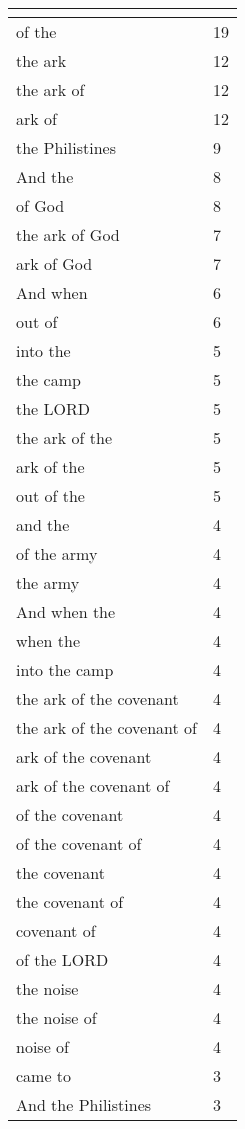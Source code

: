 \begin{center}
\begin{longtable}{|p{3.0in}|p{0.5in}|}
\hline \multicolumn{2}{c}{{ }} \\ \hline
\endfoot 
of the & 19\\ \hline 
the ark & 12\\ \hline 
the ark of & 12\\ \hline 
ark of & 12\\ \hline 
the Philistines & 9\\ \hline 
And the & 8\\ \hline 
of God & 8\\ \hline 
the ark of God & 7\\ \hline 
ark of God & 7\\ \hline 
And when & 6\\ \hline 
out of & 6\\ \hline 
into the & 5\\ \hline 
the camp & 5\\ \hline 
the LORD & 5\\ \hline 
the ark of the & 5\\ \hline 
ark of the & 5\\ \hline 
out of the & 5\\ \hline 
and the & 4\\ \hline 
of the army & 4\\ \hline 
the army & 4\\ \hline 
And when the & 4\\ \hline 
when the & 4\\ \hline 
into the camp & 4\\ \hline 
the ark of the covenant & 4\\ \hline 
the ark of the covenant of & 4\\ \hline 
ark of the covenant & 4\\ \hline 
ark of the covenant of & 4\\ \hline 
of the covenant & 4\\ \hline 
of the covenant of & 4\\ \hline 
the covenant & 4\\ \hline 
the covenant of & 4\\ \hline 
covenant of & 4\\ \hline 
of the LORD & 4\\ \hline 
the noise & 4\\ \hline 
the noise of & 4\\ \hline 
noise of & 4\\ \hline 
came to & 3\\ \hline 
And the Philistines & 3\\ \hline 

\end{longtable}
\end{center}
